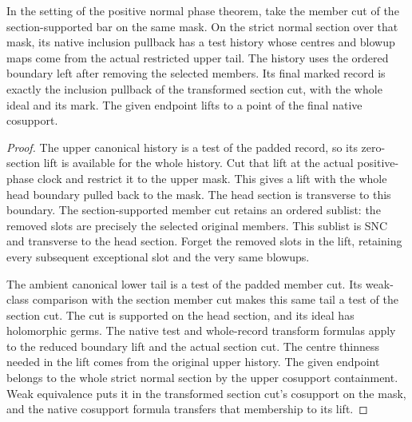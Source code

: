 \begin{theorem}
\label{hir:g1-positive-normal-native-test-tail}
\leanok
In the setting of the positive normal phase theorem, take the member cut of
the section-supported bar on the same mask. On the strict normal section
over that mask, its native inclusion pullback has a test history whose
centres and blowup maps come from the actual restricted upper tail.
The history uses the ordered boundary left after removing the selected
members. Its final marked record is exactly the inclusion pullback of
the transformed section cut, with the whole ideal and its mark. The
given endpoint lifts to a point of the final native cosupport.
\end{theorem}
\begin{proof}
The upper canonical history is a test of the padded record, so its
zero-section lift is available for the whole history. Cut that lift at the
actual positive-phase clock and restrict it to the upper mask. This gives
a lift with the whole head boundary pulled back to the mask. The head
section is transverse to this boundary. The section-supported member
cut retains an ordered sublist: the removed slots are precisely the
selected original members. This sublist is SNC and transverse to the
head section. Forget the removed slots in the lift, retaining every
subsequent exceptional slot and the very same blowups.

The ambient canonical lower tail is a test of the padded member cut.
Its weak-class comparison with the section member cut makes this same
tail a test of the section cut. The cut is supported on the head section,
and its ideal has holomorphic germs. The native test and whole-record
transform formulas apply to the reduced boundary lift and the actual
section cut. The centre thinness needed in the lift comes from the
original upper history. The given endpoint belongs to the whole strict
normal section by the upper cosupport containment. Weak equivalence
puts it in the transformed section cut's cosupport on the mask, and
the native cosupport formula transfers that membership to its lift.
\end{proof}

